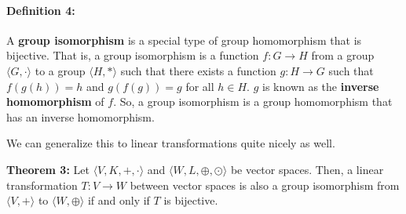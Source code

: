 \documentclass{article}
\begin{document}
\paragraph*{Definition 4:} A \textbf{group isomorphism} is a special type of group homomorphism
that is bijective. That is, a group isomorphism is a function $f:G\rightarrow H$ from a group
$\langle G, \cdot\rangle$ to a group $\langle H, *\rangle$ such that there exists 
a function $g:H\rightarrow G$ such that $f(g(h)) = h$ and $g(f(g)) = g$ for all $h\in H$.
$g$ is known as the \textbf{inverse homomorphism} of $f$. So, a group isomorphism is a
group homomorphism that has an inverse homomorphism.

We can generalize this to linear transformations quite nicely as well.
\begin{mdframed}[roundcorner=10pt, backgroundcolor=gray!10]
  \textbf{Theorem 3:} Let $\langle V, K, +, \cdot \rangle$ and 
  $\langle W, L, \oplus, \odot \rangle$ be vector spaces. Then, a linear transformation
  $T:V\rightarrow W$ between vector spaces is also a group isomorphism from $\langle V, + \rangle$ to $\langle W, \oplus \rangle$ if and only if $T$ is bijective.
\end{mdframed}
\end{document}

